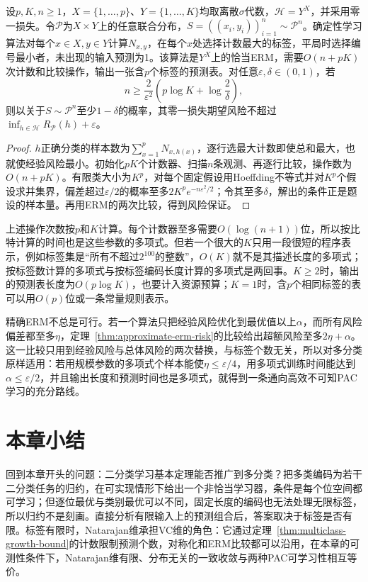\begin{theorem}[有限输入上的多分类表学习]
\label{thm:multiclass-table-erm}
设$p,K,n\geq1$，$X=\{1,\ldots,p\}$、$Y=\{1,\ldots,K\}$均取离散$\sigma$代数，$\mathcal H=Y^X$，并采用零一损失。令$\mathcal P$为$X\times Y$上的任意联合分布，$S=((x_i,y_i))_{i=1}^n\sim\mathcal P^n$。确定性学习算法对每个$x\in X,y\in Y$计算$N_{x,y}$，在每个$x$处选择计数最大的标签，平局时选择编号最小者，未出现的输入预测为1。该算法是$Y^X$上的恰当ERM，需要$O(n+pK)$次计数和比较操作，输出一张含$p$个标签的预测表。对任意$\varepsilon,\delta\in(0,1)$，若
\[
 n\geq\frac{2}{\varepsilon^2}
       \left(p\log K+\log\frac2\delta\right),
\]
则以关于$S\sim\mathcal P^n$至少$1-\delta$的概率，其零一损失期望风险不超过$\inf_{h\in\mathcal H}R_{\mathcal P}(h)+\varepsilon$。
\end{theorem}

\begin{proof}
$h$正确分类的样本数为$\sum_{x=1}^pN_{x,h(x)}$，逐行选最大计数即使总和最大，也就使经验风险最小。初始化$pK$个计数器、扫描$n$条观测、再逐行比较，操作数为$O(n+pK)$。有限类大小为$K^p$，对每个固定假设用Hoeffding不等式并对$K^p$个假设求并集界，偏差超过$\varepsilon/2$的概率至多$2K^pe^{-n\varepsilon^2/2}$；令其至多$\delta$，解出的条件正是题设的样本量。再用ERM的两次比较，得到风险保证。
\end{proof}

上述操作次数按$p$和$K$计算。每个计数器至多需要$O(\log(n+1))$位，所以按比特计算的时间也是这些参数的多项式。但若一个很大的$K$只用一段很短的程序表示，例如标签集是“所有不超过$2^{100}$的整数”，$O(K)$就不是其描述长度的多项式；按标签数计算的多项式与按标签编码长度计算的多项式是两回事。$K\geq2$时，输出的预测表长度为$O(p\log K)$，也要计入资源预算；$K=1$时，含$p$个相同标签的表可以用$O(p)$位或一条常量规则表示。

精确ERM不总是可行。若一个算法只把经验风险优化到最优值以上$\alpha$，而所有风险偏差都至多$\eta$，定理~\ref{thm:approximate-erm-risk}的比较给出超额风险至多$2\eta+\alpha$。这一比较只用到经验风险与总体风险的两次替换，与标签个数无关，所以对多分类原样适用：若用规模参数的多项式个样本能使$\eta\leq\varepsilon/4$，用多项式训练时间能达到$\alpha\leq\varepsilon/2$，并且输出长度和预测时间也是多项式，就得到一条通向高效不可知PAC学习的充分路线。

\section{本章小结}
\label{sec:multiclass-learning-summary}

回到本章开头的问题：二分类学习基本定理能否推广到多分类？把多类编码为若干二分类任务的归约，在可实现情形下给出一个非恰当学习器，条件是每个位空间都可学习；但逐位最优与类别最优可以不同，固定长度的编码也无法处理无限标签，所以归约不是刻画。直接分析有限输入上的预测组合后，答案取决于标签是否有限。标签有限时，Natarajan维承担VC维的角色：它通过定理~\ref{thm:multiclass-growth-bound}的计数限制预测个数，对称化和ERM比较都可以沿用，在本章的可测性条件下，Natarajan维有限、分布无关的一致收敛与两种PAC可学习性相互等价。

